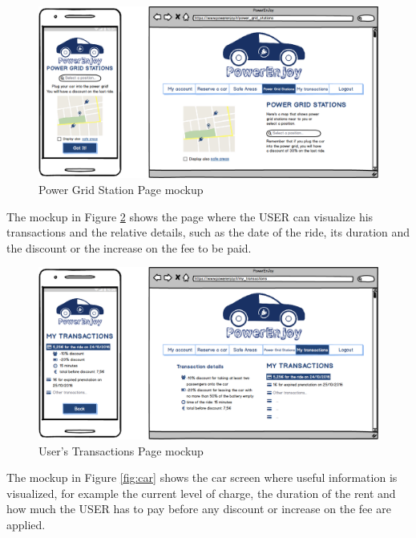 \vspace{80pt}

\begin{figure}[htbp]
\centering
\includegraphics[width=\textwidth]{Images/Mockups/ChargePlaces}
\caption{Power Grid Station Page mockup}
\label{fig:power}
\end{figure}
\clearpage

\newline
The mockup in Figure \ref{fig:transactions} shows the page where the USER can visualize his transactions and the relative details, such as the date of the ride, its duration and the discount or the increase on the fee to be paid.

\vspace{80pt}

\begin{figure}[htbp]
\centering
\includegraphics[width=\textwidth]{Images/Mockups/MyTransactions}
\caption{User's Transactions Page mockup}
\label{fig:transactions}
\end{figure}
\clearpage

\newline
The mockup in Figure \ref{fig:car} shows the car screen where useful information is visualized, for example the current level of charge, the duration of the rent and how much the USER has to pay before any discount or increase on the fee are applied.

